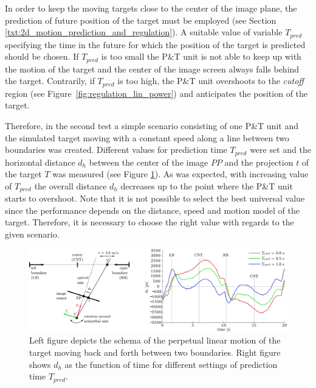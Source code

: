 In order to keep the moving targets close to the center of the image plane, the prediction of future position of the target must be employed (see Section \ref{txt:2d_motion_prediction_and_regulation}). A suitable value of variable $T_{pred}$ specifying the time in the future for which the position of the target is predicted should be chosen. If $T_{pred}$ is too small the P\&T unit is not able to keep up with the motion of the target and the center of the image screen always falls behind the target. Contrarily, if $T_{pred}$ is too high, the P\&T unit overshoots to the \textit{cutoff} region (see Figure~\ref{fig:regulation_lin_power}) and anticipates the position of the target.

Therefore, in the second test a simple scenario consisting of one P\&T unit and the simulated target moving with a constant speed along a line between two boundaries was created. Different values for prediction time $T_{pred}$ were set and the horizontal distance $d_{h}$ between the center of the image $PP$ and the projection $t$ of the target $T$ was measured (see Figure \ref{fig:test_motion_predict}). As was expected, with increasing value of $T_{pred}$ the overall distance $d_{h}$ decreases up to the point where the P\&T unit starts to overshoot. Note that it is not possible to select the best universal value since the performance depends on the distance, speed and motion model of the target. Therefore, it is necessary to choose the right value with regards to the given scenario.

\begin{figure}[htb]\centering
	\centering
	\includegraphics[width=0.95\linewidth]{fig/schema_defile_and_motion_prediction.pdf}
	\caption{Left figure depicts the schema of the perpetual linear motion of the target moving back and forth between two boundaries. Right figure shows $d_{h}$ as the function of time for different settings of prediction time $T_{pred}$.}
	\label{fig:test_motion_predict}
\end{figure}

